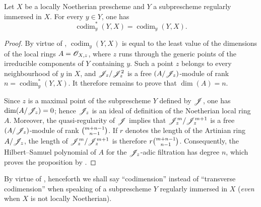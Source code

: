 \begin{proposition}[19.1.4]
\label{IV.19.1.4}
Let $X$ be a locally Noetherian prescheme and $Y$ a subprescheme regularly immersed in $X$. For every $y\in Y$, one has
\begin{equation}
  \operatorname{codim}_y^*(Y,X)=\operatorname{codim}_y(Y,X).
  \tag{19.1.4.1}\label{IV.19.1.4.1}
\end{equation}
\end{proposition}

\begin{proof}
By virtue of , $\operatorname{codim}_y(Y,X)$ is equal to the least value of the dimensions of the local rings $A=\mathscr{O}_{X,z}$, where $z$ runs through the generic points of the irreducible components of $Y$ containing $y$. Such a point $z$ belongs to every neighbourhood of $y$ in $X$, and $\mathscr{J}_z/\mathscr{J}_z^2$ is a free $(A/\mathscr{J}_z)$-module of rank $n=\operatorname{codim}_y^*(Y,X)$.
It therefore remains to prove that $\dim(A)=n$.


Since $z$ is a maximal point of the subprescheme $Y$ defined by $\mathscr{J}$, one has $\dim(A/\mathscr{J}_z)=0$; hence $\mathscr{J}_z$ is an ideal of definition of the Noetherian local ring $A$. Moreover, the quasi-regularity of $\mathscr{J}$ implies that $\mathscr{J}_z^m/\mathscr{J}_z^{m+1}$ is a free $(A/\mathscr{J}_z)$-module of rank $\binom{m+n- 1}{n- 1}$. If $r$ denotes the length of the Artinian ring $A/\mathscr{J}_z$, the length of $\mathscr{J}_z^m/\mathscr{J}_z^{m+1}$ is therefore $r\binom{m+n- 1}{n- 1}$.
Consequently, the Hilbert--Samuel polynomial of $A$ for the $\mathscr{J}_z$-adic filtration has degree $n$, which proves the proposition by .
\end{proof}

By virtue of , henceforth we shall say ``codimension'' instead of ``transverse codimension'' when speaking of a subprescheme $Y$ regularly immersed in $X$ (\emph{even} when $X$ is not locally Noetherian).

